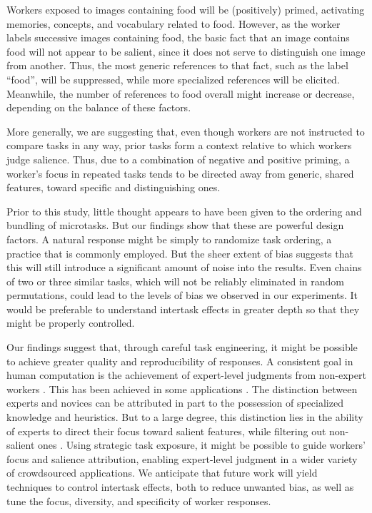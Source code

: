 \documentclass[12pt]{article}
\begin{document}
Workers exposed to images containing food will be (positively) primed, 
activating memories, concepts, and vocabulary related to food.  
However, as the worker labels successive images containing food, the basic 
fact that an image contains food will not appear to be salient, since it 
does not serve to distinguish one image from another.  Thus, the most 
generic references to that fact, such as the label ``food'', 
will be suppressed, while more specialized references will be elicited.  
Meanwhile, the number of references to food overall might increase or 
decrease, depending on the balance of these factors.  

More generally, we are suggesting that, even though workers are not 
instructed to compare tasks in any way, prior tasks form a 
context relative to which workers judge salience.  Thus, due to a combination 
of negative and positive priming, a worker's focus 
in repeated tasks tends to be directed away from generic, shared features, 
toward specific and distinguishing ones.

Prior to this study, little thought appears to have been given to the 
ordering and bundling of microtasks.  But our findings show that these are 
powerful design factors.  A natural response might be simply to randomize 
task ordering, a practice that is commonly employed.  But the sheer extent of 
bias suggests that this will still introduce a significant amount of noise
into the results.  Even chains of two or three similar tasks, which
will not be reliably eliminated in random permutations, could lead
to the levels of bias we observed in our experiments.
It would be preferable to understand intertask
effects in greater depth so that they might be properly controlled.

Our findings suggest that, through careful task engineering,
it might be possible to achieve greater quality and reproducibility
of responses.  
A consistent goal in human computation is the achievement of expert-level
judgments from non-expert workers \cite{kittur2011crowdforge}.  
This has been achieved in some
applications \cite{Mortensen20131020,Warby2014385}. 
The distinction between experts and novices can be 
attributed in part to the possession of specialized knowledge and heuristics. 
But to a large degree, this distinction lies in the ability of 
experts to direct their focus toward salient features, while filtering out 
non-salient ones \cite{kellman2009perceptual}.  Using strategic task 
exposure, it might be possible to guide workers' focus and salience 
attribution, enabling expert-level judgment in a wider variety of 
crowdsourced applications.
We anticipate that future work will yield techniques to control intertask 
effects, both to reduce unwanted bias, as well as tune the 
focus, diversity, and specificity of worker responses.
\end{document}
